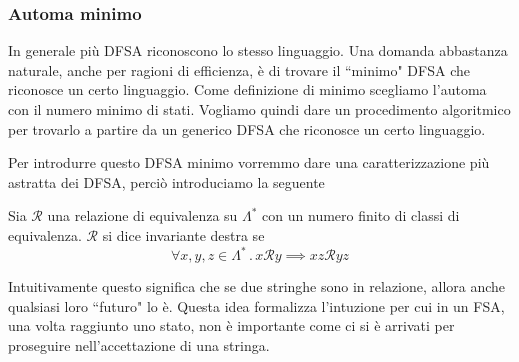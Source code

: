 \documentclass[12pt]{article}
\numberwithin{theorem}{subsection}
\begin{document}
\subsubsection{Automa minimo}
In generale più DFSA riconoscono lo stesso linguaggio. Una domanda abbastanza naturale, anche per ragioni di efficienza, è di trovare il ``minimo" DFSA che riconosce un certo linguaggio. Come definizione di minimo scegliamo l'automa con il numero minimo di stati. Vogliamo quindi dare un procedimento algoritmico per trovarlo a partire da un generico DFSA che riconosce un certo linguaggio.

Per introdurre questo DFSA minimo vorremmo dare una caratterizzazione più astratta dei DFSA, perciò introduciamo la seguente
\begin{definition}
	Sia $\mathcal{R}$ una relazione di equivalenza su $\Lambda^*$ con un numero finito di classi di equivalenza. $\mathcal{R}$ si dice invariante destra se
	\[
	\forall x, y, z \in \Lambda^* \,.\, x \mathcal{R} y \implies xz \mathcal{R} yz
	\]
\end{definition}

Intuitivamente questo significa che se due stringhe sono in relazione, allora anche qualsiasi loro ``futuro" lo è. Questa idea formalizza l'intuzione per cui in un FSA, una volta raggiunto uno stato, non è importante come ci si è arrivati per proseguire nell'accettazione di una stringa.
\end{document}
